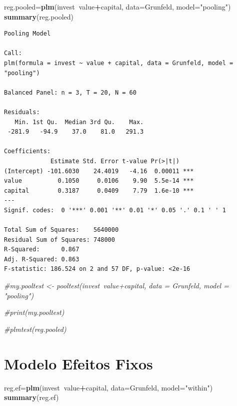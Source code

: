 \documentclass[12pt,brazil,oneside]{book}
\newenvironment{Shaded}{\begin{snugshade}}{\end{snugshade}}
\newcommand{\CommentTok}[1]{\textcolor[rgb]{0.56,0.35,0.01}{\textit{#1}}}
\newcommand{\DataTypeTok}[1]{\textcolor[rgb]{0.13,0.29,0.53}{#1}}
\newcommand{\KeywordTok}[1]{\textcolor[rgb]{0.13,0.29,0.53}{\textbf{#1}}}
\newcommand{\NormalTok}[1]{#1}
\newcommand{\OperatorTok}[1]{\textcolor[rgb]{0.81,0.36,0.00}{\textbf{#1}}}
\newcommand{\StringTok}[1]{\textcolor[rgb]{0.31,0.60,0.02}{#1}}
\begin{document}
\begin{Shaded}
\begin{Highlighting}[]
\NormalTok{reg.pooled=}\KeywordTok{plm}\NormalTok{(invest}\OperatorTok{~}\NormalTok{value}\OperatorTok{+}\NormalTok{capital, }
               \DataTypeTok{data=}\NormalTok{Grunfeld, }\DataTypeTok{model=}\StringTok{"pooling"}\NormalTok{)}
\KeywordTok{summary}\NormalTok{(reg.pooled)}
\end{Highlighting}
\end{Shaded}

\begin{verbatim}
Pooling Model

Call:
plm(formula = invest ~ value + capital, data = Grunfeld, model = "pooling")

Balanced Panel: n = 3, T = 20, N = 60

Residuals:
   Min. 1st Qu.  Median 3rd Qu.    Max. 
 -281.9   -94.9    37.0    81.0   291.3 

Coefficients:
             Estimate Std. Error t-value Pr(>|t|)    
(Intercept) -101.6030    24.4019   -4.16  0.00011 ***
value          0.1050     0.0106    9.90  5.5e-14 ***
capital        0.3187     0.0409    7.79  1.6e-10 ***
---
Signif. codes:  0 '***' 0.001 '**' 0.01 '*' 0.05 '.' 0.1 ' ' 1

Total Sum of Squares:    5640000
Residual Sum of Squares: 748000
R-Squared:      0.867
Adj. R-Squared: 0.863
F-statistic: 186.524 on 2 and 57 DF, p-value: <2e-16
\end{verbatim}

\begin{Shaded}
\begin{Highlighting}[]
\CommentTok{#my.pooltest <- pooltest(invest~value+capital, data = Grunfeld, model = "pooling")}


\CommentTok{#print(my.pooltest)}

\CommentTok{#plmtest(reg.pooled)}
\end{Highlighting}
\end{Shaded}

\hypertarget{modelo-efeitos-fixos}{%
\section{Modelo Efeitos Fixos}\label{modelo-efeitos-fixos}}

\begin{Shaded}
\begin{Highlighting}[]
\NormalTok{reg.ef=}\KeywordTok{plm}\NormalTok{(invest}\OperatorTok{~}\NormalTok{value}\OperatorTok{+}\NormalTok{capital, }
           \DataTypeTok{data=}\NormalTok{Grunfeld, }\DataTypeTok{model=}\StringTok{"within"}\NormalTok{)}
\KeywordTok{summary}\NormalTok{(reg.ef)}
\end{Highlighting}
\end{Shaded}
\end{document}
